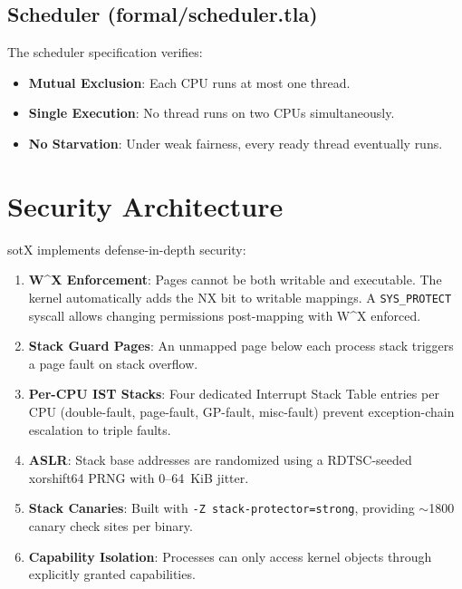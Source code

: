 \documentclass[11pt,letterpaper]{article}
\theoremstyle{definition}
\begin{document}
\subsection{Scheduler (formal/scheduler.tla)}

The scheduler specification verifies:
\begin{itemize}[nosep]
    \item \textbf{Mutual Exclusion}: Each CPU runs at most one thread.
    \item \textbf{Single Execution}: No thread runs on two CPUs simultaneously.
    \item \textbf{No Starvation}: Under weak fairness, every ready thread
          eventually runs.
\end{itemize}

\section{Security Architecture}
\label{sec:security}

sotX implements defense-in-depth security:

\begin{enumerate}[nosep]
    \item \textbf{W\^{}X Enforcement}: Pages cannot be both writable and
          executable. The kernel automatically adds the NX bit to writable
          mappings. A \texttt{SYS\_PROTECT} syscall allows changing permissions
          post-mapping with W\^{}X enforced.
    \item \textbf{Stack Guard Pages}: An unmapped page below each process
          stack triggers a page fault on stack overflow.
    \item \textbf{Per-CPU IST Stacks}: Four dedicated Interrupt Stack Table
          entries per CPU (double-fault, page-fault, GP-fault, misc-fault)
          prevent exception-chain escalation to triple faults.
    \item \textbf{ASLR}: Stack base addresses are randomized using a
          RDTSC-seeded xorshift64 PRNG with 0--64~KiB jitter.
    \item \textbf{Stack Canaries}: Built with \texttt{-Z stack-protector=strong},
          providing $\sim$1800 canary check sites per binary.
    \item \textbf{Capability Isolation}: Processes can only access kernel
          objects through explicitly granted capabilities.
\end{enumerate}
\end{document}
